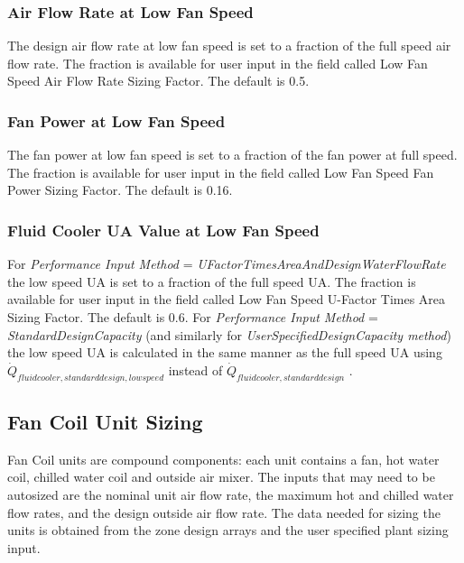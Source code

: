 \subsubsection{Air Flow Rate at Low Fan Speed}\label{air-flow-rate-at-low-fan-speed-2}

The design air flow rate at low fan speed is set to a fraction of the full speed air flow rate. The fraction is available for user input in the field called Low Fan Speed Air Flow Rate Sizing Factor. The default is 0.5.

\subsubsection{Fan Power at Low Fan Speed}\label{fan-power-at-low-fan-speed-2}

The fan power at low fan speed is set to a fraction of the fan power at full speed. The fraction is available for user input in the field called Low Fan Speed Fan Power Sizing Factor. The default is 0.16.

\subsubsection{Fluid Cooler UA Value at Low Fan Speed}\label{fluid-cooler-ua-value-at-low-fan-speed-1}

For \emph{Performance Input Method} = \emph{UFactorTimesAreaAndDesignWaterFlowRate} the low speed UA is set to a fraction of the full speed UA. The fraction is available for user input in the field called Low Fan Speed U-Factor Times Area Sizing Factor. The default is 0.6. For \emph{Performance Input Method} = \emph{StandardDesignCapacity} (and similarly for \emph{UserSpecifiedDesignCapacity method}) the low speed UA is calculated in the same manner as the full speed UA using \({\dot Q_{fluidcooler,standarddesign,lowspeed}}\) instead of \({\dot Q_{fluidcooler,standarddesign}}\) .

\subsection{Fan Coil Unit Sizing}\label{fan-coil-unit-sizing}

Fan Coil units are compound components: each unit contains a fan, hot water coil, chilled water coil and outside air mixer. The inputs that may need to be autosized are the nominal unit air flow rate, the maximum hot and chilled water flow rates, and the design outside air flow rate. The data needed for sizing the units is obtained from the zone design arrays and the user specified plant sizing input.


